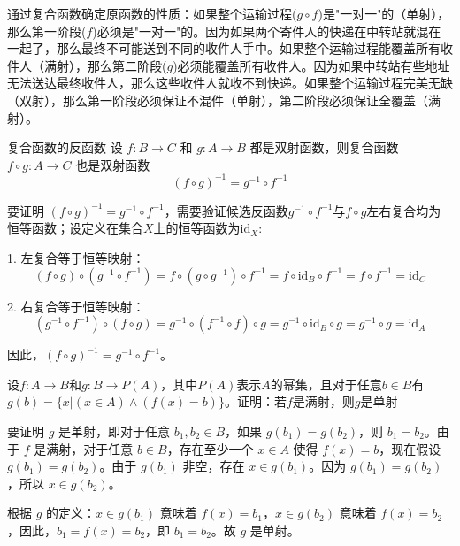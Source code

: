 \documentclass[lang=cn,11pt]{elegantbook}
\begin{document}
通过复合函数确定原函数的性质：如果整个运输过程($g \circ f$)是"一对一"的（单射），那么第一阶段($f$)必须是"一对一"的。因为如果两个寄件人的快递在中转站就混在一起了，那么最终不可能送到不同的收件人手中。如果整个运输过程能覆盖所有收件人（满射），那么第二阶段($g$)必须能覆盖所有收件人。因为如果中转站有些地址无法送达最终收件人，那么这些收件人就收不到快递。如果整个运输过程完美无缺（双射），那么第一阶段必须保证不混件（单射），第二阶段必须保证全覆盖（满射）。
\begin{theorem}{复合函数的反函数}
设 $f: B \to C$ 和 $g: A \to B$ 都是双射函数，则复合函数 $f \circ g: A \to C$ 也是双射函数\vspace{-10pt}
\[(f \circ g)^{-1} = g^{-1} \circ f^{-1}\]
\end{theorem}
要证明 $(f \circ g)^{-1} = g^{-1} \circ f^{-1}$，需要验证候选反函数$g^{-1}\circ f^{-1}$与$f\circ g$左右复合均为恒等函数；设定义在集合$X$上的恒等函数为$\text{id}_X$:

1. 左复合等于恒等映射：
\[
(f \circ g) \circ (g^{-1} \circ f^{-1}) = f \circ (g \circ g^{-1}) \circ f^{-1} = f \circ \text{id}_B \circ f^{-1} = f \circ f^{-1} = \text{id}_C
\]

2. 右复合等于恒等映射：
\[
(g^{-1} \circ f^{-1}) \circ (f \circ g) = g^{-1} \circ (f^{-1} \circ f) \circ g = g^{-1} \circ \text{id}_B \circ g = g^{-1} \circ g = \text{id}_A
\]

因此，$(f \circ g)^{-1} = g^{-1} \circ f^{-1}$。
\begin{example}
    设$f:A\to B$和$g:B\to P(A)$，其中$P(A)$表示$A$的幂集，且对于任意$b\in B$有$g(b)=\{x|(x\in A)\land(f(x)=b)\}$。证明：若$f$是满射，则$g$是单射
\end{example}
要证明 $g$ 是单射，即对于任意 $b_1, b_2 \in B$，如果 $g(b_1) = g(b_2)$，则 $b_1 = b_2$。由于 $f$ 是满射，对于任意 $b \in B$，存在至少一个 $x \in A$ 使得 $f(x) = b$，现在假设 $g(b_1) = g(b_2)$。由于 $g(b_1)$ 非空，存在 $x \in g(b_1)$。因为 $g(b_1) = g(b_2)$，所以 $x \in g(b_2)$。

根据 $g$ 的定义：$x \in g(b_1)$ 意味着 $f(x) = b_1$，$x \in g(b_2)$ 意味着 $f(x) = b_2$，因此，$b_1 = f(x) = b_2$，即 $b_1 = b_2$。故 $g$ 是单射。
\end{document}
